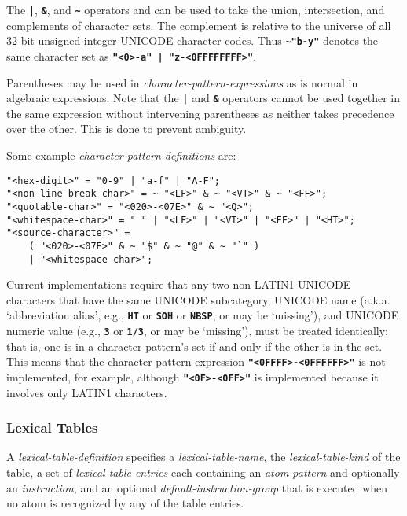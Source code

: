 \documentclass[12pt]{article}
\newcommand{\TT}[1]{{\tt \bfseries #1}}
\newenvironment{indpar}[1][0.3in]%
	{\begin{list}{}%
		     {\setlength{\itemsep}{0in}%
		      \setlength{\topsep}{0in}%
		      \setlength{\parsep}{1ex}%
		      \setlength{\labelwidth}{#1}%
		      \setlength{\leftmargin}{#1}%
		      \addtolength{\leftmargin}{\labelsep}}%
	 \item}%
	{\end{list}}
\begin{document}
The \TT{|}, \TT{\&}, and \TT{\textasciitilde} operators and can be used to take
the union, intersection, and complements of character sets.  The complement
is relative to the universe of all 32 bit unsigned integer UNICODE
character codes.  Thus \TT{\textasciitilde "b-y"}
denotes the same character set as
\TT{"<0>-a"\,|\,"z-<0FFFFFFFF>"}.

Parentheses may be used in {\em character-pattern-expressions} as is
normal in algebraic expressions.
Note that the \TT{|} and \TT{\&} operators cannot be used together
in the same expression without intervening parentheses as neither
takes precedence over the other.  This is done to prevent ambiguity.

Some example {\em character-pattern-definitions} are:

\begin{indpar}[0.05in]\begin{verbatim}
"<hex-digit>" = "0-9" | "a-f" | "A-F";
"<non-line-break-char>" = ~ "<LF>" & ~ "<VT>" & ~ "<FF>";
"<quotable-char>" = "<020>-<07E>" & ~ "<Q>";
"<whitespace-char>" = " " | "<LF>" | "<VT>" | "<FF>" | "<HT>";
"<source-character>" =
    ( "<020>-<07E>" & ~ "$" & ~ "@" & ~ "`" )
    | "<whitespace-char>";
\end{verbatim}\end{indpar}

Current implementations require that any two non-LATIN1 UNICODE
characters that have the same UNICODE subcategory, UNICODE name
(a.k.a. `abbreviation alias',
e.g., \TT{HT} or \TT{SOH} or \TT{NBSP}, or may be `missing'),
and UNICODE numeric value (e.g., \TT{3} or \TT{1/3}, or may be `missing'),
must be treated identically: that is, one is in a character pattern's set
if and only if the other is in the set.  This means that the
character pattern expression \TT{"<0FFFF>-<0FFFFFF>"} is not implemented,
for example, although \TT{"<0F>-<0FF>"} is implemented because it
involves only LATIN1 characters.

\subsubsection{Lexical Tables}

A {\em lexical-table-definition} specifies a {\em lexical-table-name},
the {\em lexical-table-kind} of the table,
a set of {\em lexical-table-entries}
each containing an {\em atom-pattern} and optionally an {\em instruction},
and an optional {\em default-instruction-group} that is executed when
no atom is recognized by any of the table entries.
\end{document}
